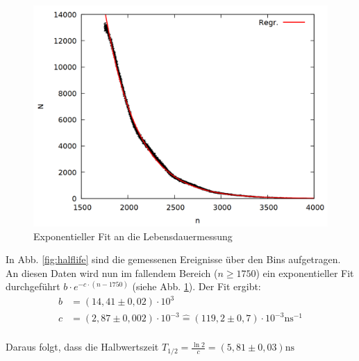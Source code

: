 \begin{figure}
\centering
\includegraphics[width=0.7\linewidth]{data/uebernacht2.png}
\caption{Exponentieller Fit an die Lebensdauermessung}
\label{fig:halflife2}
\end{figure}

In Abb. \ref{fig:halflife} sind die gemessenen Ereignisse über den Bins aufgetragen. An diesen Daten wird nun im fallendem Bereich ($n \geq 1750$) ein exponentieller Fit durchgeführt $b\cdot e^{-c\cdot (n-1750)}$ (siehe Abb. \ref{fig:halflife2}). Der Fit ergibt:
\begin{align*}
b &= (14,41 \pm 0,02) \cdot 10^3\\
c &= (2,87 \pm 0,002) \cdot 10^{-3} \mathrel{\widehat{=}} (119,2 \pm 0,7)\cdot 10^{-3} \si{\nano\second}^{-1}\\
\end{align*}

Daraus folgt, dass die Halbwertszeit $T_{1/2} = \frac{\ln{2}}{c} = (5,81 \pm 0,03) \si{\nano\second}$